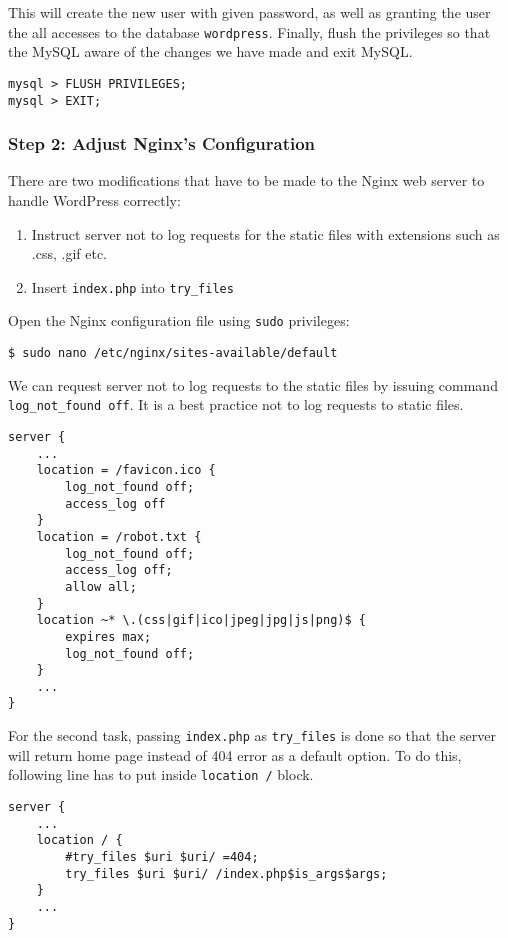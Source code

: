 This will create the new user with given password, as well as granting the user the all accesses to the database \texttt{wordpress}. Finally, flush the privileges so that the MySQL aware of the changes we have made and exit MySQL.

\begin{lstlisting}
mysql > FLUSH PRIVILEGES;
mysql > EXIT;
\end{lstlisting}


\subsubsection*{Step 2: Adjust Nginx's Configuration}
There are two modifications that have to be made to the Nginx web server to handle WordPress correctly:
\begin{enumerate}
\item Instruct server not to log requests for the static files with extensions such as .css, .gif etc.
\item Insert \texttt{index.php} into \texttt{try\_files}
\end{enumerate}

Open the Nginx configuration file using \texttt{sudo} privileges:
\begin{lstlisting}
$ sudo nano /etc/nginx/sites-available/default
\end{lstlisting}

We can request server not to log requests to the static files by issuing command {\tt log\_not\_found off}. It is a best practice not to log requests to static files.

\begin{lstlisting}
server {
	...
	location = /favicon.ico {
		log_not_found off;
		access_log off
	}
	location = /robot.txt {
		log_not_found off;
		access_log off;
		allow all;
	}
	location ~* \.(css|gif|ico|jpeg|jpg|js|png)$ {
		expires max;
		log_not_found off;
	}
	...
}
\end{lstlisting}

For the second task, passing \texttt{index.php} as \texttt{try\_files} is done so that the server will return home page instead of 404 error as a default option. To do this, following line has to put inside \texttt{location /} block.

\begin{lstlisting}
server {
	...
	location / {
		#try_files $uri $uri/ =404;
		try_files $uri $uri/ /index.php$is_args$args;
	}
	...
}
\end{lstlisting}

